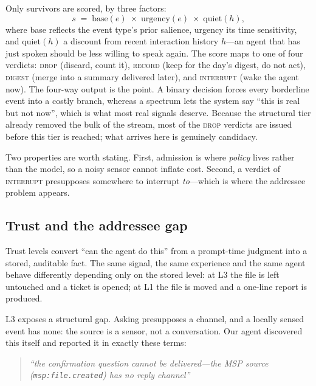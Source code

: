 \documentclass[10pt,a4paper]{article}
\begin{document}
Only survivors are scored, by three factors:
\begin{equation}
s \;=\; \mathrm{base}(e)\;\times\;\mathrm{urgency}(e)\;\times\;\mathrm{quiet}(h),
\end{equation}
where base reflects the event type's prior salience, urgency its time sensitivity, and $\mathrm{quiet}(h)$ a discount from recent interaction history $h$---an agent that has just spoken should be less willing to speak again. The score maps to one of four verdicts: \textsc{drop} (discard, count it), \textsc{record} (keep for the day's digest, do not act), \textsc{digest} (merge into a summary delivered later), and \textsc{interrupt} (wake the agent now). The four-way output is the point. A binary decision forces every borderline event into a costly branch, whereas a spectrum lets the system say ``this is real but not now'', which is what most real signals deserve. Because the structural tier already removed the bulk of the stream, most of the \textsc{drop} verdicts are issued before this tier is reached; what arrives here is genuinely candidacy.

Two properties are worth stating. First, admission is where \emph{policy} lives rather than the model, so a noisy sensor cannot inflate cost. Second, a verdict of \textsc{interrupt} presupposes somewhere to interrupt \emph{to}---which is where the addressee problem appears.

\subsection{Trust and the addressee gap}

Trust levels convert ``can the agent do this'' from a prompt-time judgment
into a stored, auditable fact. The same signal, the same experience and the
same agent behave differently depending only on the stored level: at L3 the
file is left untouched and a ticket is opened; at L1 the file is moved and a
one-line report is produced.

L3 exposes a structural gap. Asking presupposes a channel, and a locally
sensed event has none: the source is a sensor, not a conversation. Our agent
discovered this itself and reported it in exactly these terms:

\begin{quote}\small\itshape
``the confirmation question cannot be delivered---the MSP source
(\texttt{msp:file.created}) has no reply channel''
\end{quote}
\end{document}
